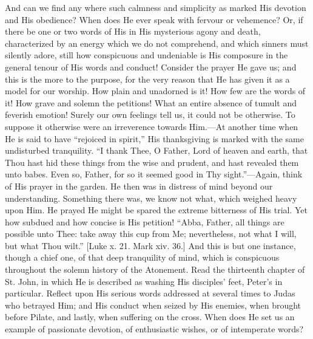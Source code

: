 And can we find any where such calmness and simplicity
as marked His devotion and His obedience? When does He
ever speak with fervour or vehemence? Or, if there be one
or two words of His in His mysterious agony and death,
characterized by an energy which we do not comprehend,
and which sinners must silently adore, still how
conspicuous and undeniable is His composure in the
general tenour of His words and conduct! Consider the
prayer He gave us; and this is the more to the purpose,
for the very reason that He has given it as a model for
our worship. How plain and unadorned is it! How few are
the words of it! How grave and solemn the petitions! What
an entire absence of tumult and feverish emotion! Surely
our own feelings tell us, it could not be otherwise. To
suppose it otherwise were an irreverence towards
Him.—At another time when He is said to have
``rejoiced in spirit,'' His thanksgiving is
marked with the same undisturbed tranquility. ``I
thank Thee, O Father, Lord of heaven and earth, that Thou
hast hid these things from the wise and prudent, and hast
revealed them unto babes. Even so, Father, for so it
seemed good in Thy sight.''—Again, think of His
prayer in the garden. He then was in distress of mind
beyond our understanding. Something there was, we know
not what, which weighed heavy upon Him. He prayed He
might be spared the extreme bitterness of His trial. Yet
how subdued and how concise is His petition! ``Abba,
Father, all things are possible unto Thee: take away this
cup from Me; nevertheless, not what I will, but what Thou
wilt.'' [Luke x. 21. Mark xiv. 36.] And this is but
one instance, though a chief one, of that deep
tranquility of mind, which is conspicuous throughout the
solemn history of the Atonement. Read the thirteenth
chapter of St. John, in which He is described as washing
His disciples' feet, Peter's in particular. Reflect upon
His serious words addressed at several times to Judas who
betrayed Him; and His conduct when seized by His enemies,
when brought before Pilate, and lastly, when suffering on
the cross. When does He set us an example of passionate
devotion, of enthusiastic wishes, or of intemperate
words?

